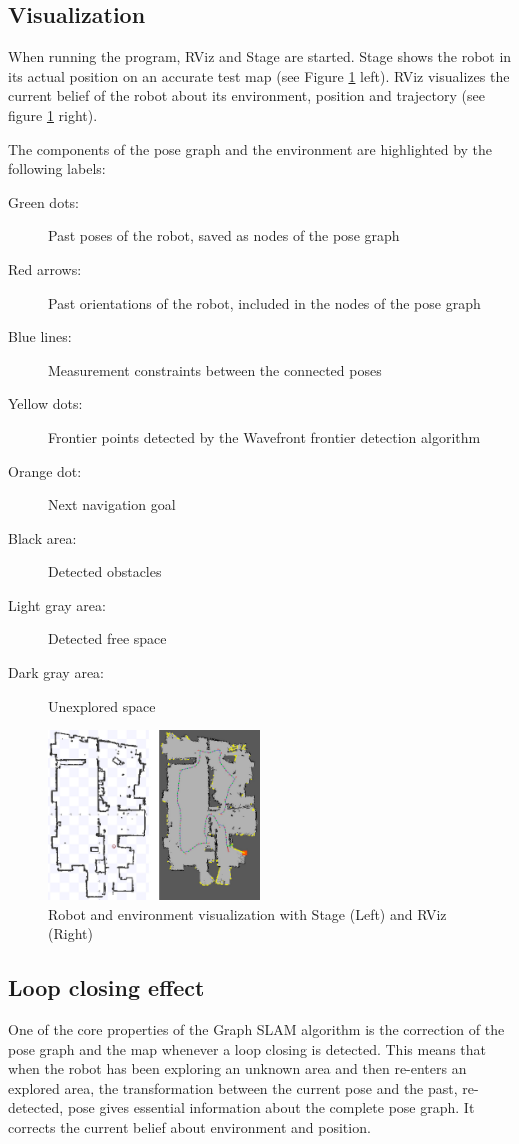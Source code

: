\documentclass{ba-kecs}
\begin{document}
\subsection{Visualization}
\label{sec:visual}
When running the program, RViz and Stage are started. Stage shows the robot in its actual position on an accurate test map (see Figure \ref{fig:stage_and_rviz} left). RViz visualizes the current belief of the robot about its environment, position and trajectory (see figure \ref{fig:stage_and_rviz} right).

The components of the pose graph and the environment are highlighted by the following labels:

\begin{description}
\item[Green dots:]Past poses of the robot, saved as nodes of the pose graph
\item[Red arrows:]Past orientations of the robot, included in the nodes of the pose graph
\item[Blue lines:]Measurement constraints between the connected poses
\item[Yellow dots:]Frontier points detected by the Wavefront frontier detection algorithm
\item[Orange dot:]Next navigation goal
\item[Black area:]Detected obstacles
\item[Light gray area:]Detected free space
\item[Dark gray area:]Unexplored space
\end{description}

\begin{figure}[htbp]
	\centering
		\includegraphics[width=0.50\textwidth]{figures/Stage_and_rviz.jpg}
	\caption{Robot and environment visualization with Stage (Left) and RViz (Right)}
	\label{fig:stage_and_rviz}
\end{figure}

\subsection{Loop closing effect}
\label{sec:loopClosing}
One of the core properties of the Graph SLAM algorithm is the correction of the pose graph and the map whenever a loop closing is detected. This means that when the robot has been exploring an unknown area and then re-enters an explored area, the transformation between the current pose and the past, re-detected, pose gives essential information about the complete pose graph. It corrects the current belief about environment and position.
\end{document}

